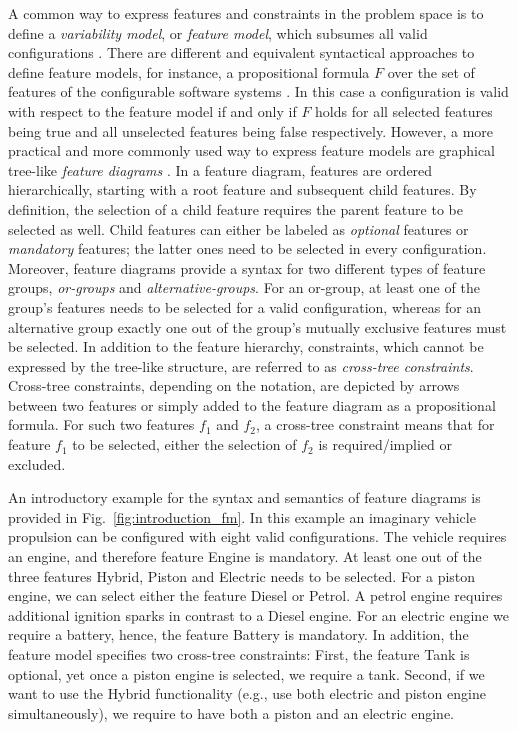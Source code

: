 A common way to express features and constraints in the problem space is to
define a \emph{variability model}, or \emph{feature model}, which subsumes all
valid configurations
\citep{kang_feature-oriented_1990,apel_feature-oriented_2013}. There are different and equivalent syntactical approaches to define feature models, for instance, a propositional formula $F$ over the set of
features of the configurable software systems \citep{batory_feature_2005}. In
this case a configuration is valid with respect to the feature model if and only if $F$ holds for all
selected features being true and all unselected features being false respectively. 
However, a more practical and more commonly used way to express feature models
are graphical tree-like \emph{feature diagrams}
\citep{apel_feature-oriented_2013}. In a feature diagram, features are ordered
hierarchically, starting with a root feature and subsequent child features. By
definition, the selection of a child feature requires the parent feature to be
selected as well. Child features can either be labeled as \emph{optional}
features  or \emph{mandatory} features; the latter ones need to be selected in
every configuration.
Moreover, feature diagrams
provide a syntax for two different types of feature groups, \emph{or-groups} and
\emph{alternative-groups}. For an or-group, at least one of the group's features
needs to be selected for a valid configuration, whereas for an alternative group
exactly one out of the group's mutually exclusive features must be selected. In
addition to the feature hierarchy, constraints, which cannot be expressed by
the tree-like structure, are referred to as \emph{cross-tree constraints}.
Cross-tree constraints, depending on the notation, are depicted by arrows
between two features or simply added to the feature diagram as a propositional
formula. For such two features $f_1$ and $f_2$, a cross-tree constraint means
that for feature $f_1$ to be selected, either the selection of $f_2$ is
required/implied or excluded.

An introductory example for the syntax and semantics of feature diagrams is
provided in Fig.~\ref{fig:introduction_fm}. In this example an imaginary
vehicle propulsion can be configured with eight valid configurations. The
vehicle requires an engine, and therefore feature \textsf{Engine} is mandatory.
At least one out of the three features \textsf{Hybrid}, \textsf{Piston} and \textsf{Electric} needs to be selected. For a piston engine, we can select either the feature \textsf{Diesel}
or \textsf{Petrol}. A petrol engine requires additional ignition sparks in
contrast to a Diesel engine. For an electric engine we require a
battery, hence, the feature \textsf{Battery} is mandatory.
In addition, the feature model specifies two cross-tree constraints: First, the
feature \textsf{Tank} is optional, yet once a piston engine is selected, we
require  a tank. Second, if we want to use the \textsf{Hybrid} functionality
(e.g., use both electric and piston engine simultaneously), we require to have both a piston
and an electric engine.

